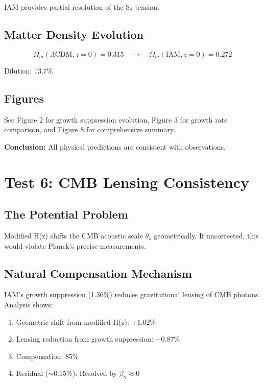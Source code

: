 \documentclass[11pt,letterpaper]{article}
\begin{document}
\noindent IAM provides partial resolution of the S$_8$ tension.

\subsection{Matter Density Evolution}

\begin{equation}
\Omega_m(\Lambda\text{CDM}, z=0) = 0.315 \quad \rightarrow \quad \Omega_m(\text{IAM}, z=0) = 0.272
\end{equation}

\noindent Dilution: 13.7\%

\subsection{Figures}

See Figure 2 for growth suppression evolution, Figure 3 for growth rate comparison, and Figure 8 for comprehensive summary.

\noindent\textbf{Conclusion:} All physical predictions are consistent with observations.

\section{Test 6: CMB Lensing Consistency}

\subsection{The Potential Problem}

Modified H(z) shifts the CMB acoustic scale $\theta_s$ geometrically. If uncorrected, this would violate Planck's precise measurements.

\subsection{Natural Compensation Mechanism}

IAM's growth suppression (1.36\%) reduces gravitational lensing of CMB photons. Analysis shows:

\begin{enumerate}
\item Geometric shift from modified H(z): $+1.02\%$
\item Lensing reduction from growth suppression: $-0.87\%$
\item Compensation: 85\%
\item Residual ($\sim 0.15\%$): Resolved by $\beta_\gamma \approx 0$
\end{enumerate}
\end{document}
